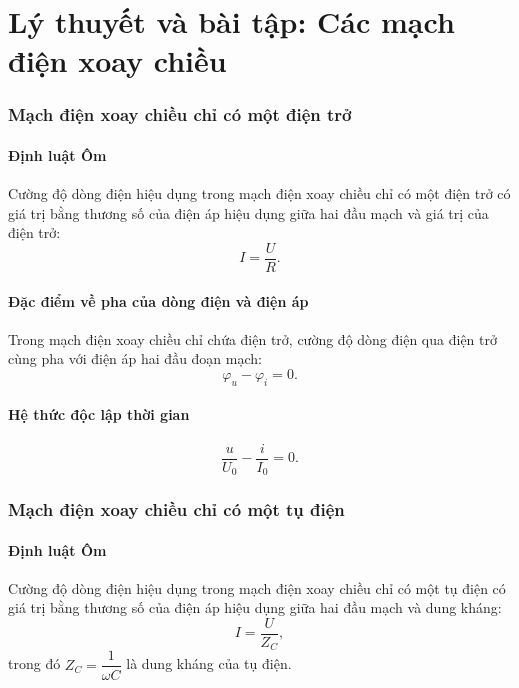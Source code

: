 
\chapter[Lý thuyết và bài tập: Các mạch điện xoay chiều]{Lý thuyết và bài tập: Các mạch điện xoay chiều}
\subsection{Mạch điện xoay chiều chỉ có một điện trở}
\subsubsection{Định luật Ôm}
Cường độ dòng điện hiệu dụng trong mạch điện xoay chiều chỉ có một điện trở có giá trị bằng thương số của điện áp hiệu dụng giữa hai đầu mạch và giá trị của điện trở:
\begin{equation*}
	I = \dfrac{U}{R}.
\end{equation*}
\subsubsection{Đặc điểm về pha của dòng điện và điện áp}
Trong mạch điện xoay chiều chỉ chứa điện trở, cường độ dòng điện qua điện trở cùng pha với điện áp hai đầu đoạn mạch:
\begin{equation*}
	\varphi_u - \varphi_i = 0.
\end{equation*}
\subsubsection{Hệ thức độc lập thời gian}
\begin{equation*}
	\dfrac{u}{U_0}-\dfrac{i}{I_0}=0.
\end{equation*}
\subsection{Mạch điện xoay chiều chỉ có một tụ điện}
\subsubsection{Định luật Ôm}
Cường độ dòng điện hiệu dụng trong mạch điện xoay chiều chỉ có một tụ điện có giá trị bằng thương số của điện áp hiệu dụng giữa hai đầu mạch và dung kháng:
\begin{equation*}
	I = \dfrac{U}{Z_C},
\end{equation*}
trong đó $Z_C = \dfrac{1}{\omega C}$ là dung kháng của tụ điện.
